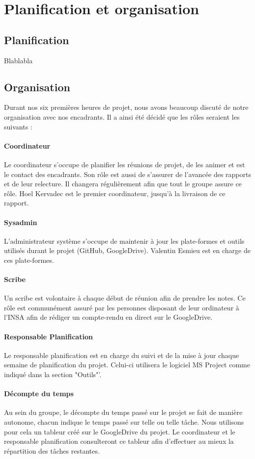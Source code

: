 \section{Planification et organisation}
	\subsection{Planification}
		Blablabla

	\subsection{Organisation}
	    Durant nos six premières heures de projet, nous avons beaucoup discuté de notre organisation avec nos encadrants. Il a ainsi été décidé que les rôles seraient les suivants :
	    \paragraph{Coordinateur} Le coordinateur s'occupe de planifier les réunions de projet, de les animer et est le contact des encadrants. Son rôle est aussi de s'assurer de l'avancée des rapports et de leur relecture. Il changera régulièrement afin que tout le groupe assure ce rôle. Hoel Kervadec est le premier coordinateur, jusqu'à la livraison de ce rapport.
	    \paragraph{Sysadmin} L'administrateur système s'occupe de maintenir à jour les plate-formes et outils utilisés durant le projet (GitHub, GoogleDrive). Valentin Esmieu est en charge de ces plate-formes.
	    \paragraph{Scribe} Un scribe est volontaire à chaque début de réunion afin de prendre les notes. Ce rôle est communément assuré par les personnes disposant de leur ordinateur à l'INSA afin de rédiger un compte-rendu en direct sur le GoogleDrive.
	    \paragraph{Responsable Planification} Le responsable planification est en charge du suivi et de la mise à jour chaque semaine de planification du projet. Celui-ci utilisera le logiciel MS Project comme indiqué dans la section "Outils"'.
	    \paragraph{Décompte du temps} Au sein du groupe, le décompte du temps passé sur le projet se fait de manière autonome, chacun indique le temps passé sur telle ou telle tâche. Nous utilisons pour cela un tableur créé sur le GoogleDrive du projet. Le coordinateur et le responsable planification consulteront ce tableur afin d'effectuer au mieux la répartition des tâches restantes.

